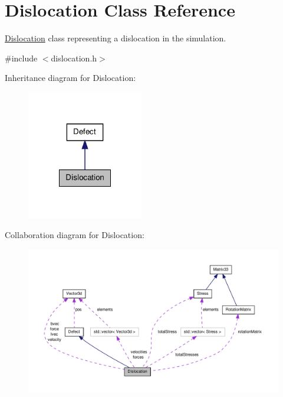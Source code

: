 \hypertarget{classDislocation}{\section{\-Dislocation \-Class \-Reference}
\label{d3/dc6/classDislocation}
}


\hyperlink{classDislocation}{\-Dislocation} class representing a dislocation in the simulation.  




{\ttfamily \#include $<$dislocation.\-h$>$}



\-Inheritance diagram for \-Dislocation\-:\nopagebreak
\begin{figure}[H]
\begin{center}
\leavevmode
\includegraphics[width=144pt]{df/dfa/classDislocation__inherit__graph}
\end{center}
\end{figure}


\-Collaboration diagram for \-Dislocation\-:\nopagebreak
\begin{figure}[H]
\begin{center}
\leavevmode
\includegraphics[width=350pt]{d7/d80/classDislocation__coll__graph}
\end{center}
\end{figure}
